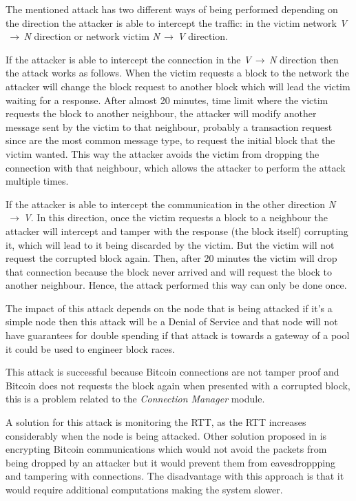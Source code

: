 The mentioned attack has two different ways of being performed depending on the direction the attacker is able to intercept the traffic: in the victim network \textit{V$\,\to\,$N} direction or network victim \textit{N$\,\to\,$V} direction.

If the attacker is able to intercept the connection in the \textit{V$\,\to\,$N} direction then the attack works as follows. When the victim requests a block to the network the attacker will change the block request to another block which will lead the victim waiting for a response. After almost 20 minutes, time limit where the victim requests the block to another neighbour, the attacker will modify another message sent by the victim to that neighbour, probably a transaction request since are the most common message type, to request the initial block that the victim wanted. This way the attacker avoids the victim from dropping the connection with that neighbour, which allows the attacker to perform the attack multiple times.

If the attacker is able to intercept the communication in the other direction \textit{N$\,\to\,$V}. In this direction, once the victim requests a block to a neighbour the attacker will intercept and tamper with the response (the block itself) corrupting it, which will lead to it being discarded by the victim. But the victim will not request the corrupted block again. Then, after 20 minutes the victim will drop that connection because the block never arrived and will request the block to another neighbour. Hence, the attack performed this way can only be done once.

The impact of this attack depends on the node that is being attacked if it's a simple node then this attack will be a Denial of Service and that node will not have guarantees for double spending if that attack is towards a gateway of a pool it could be used to engineer block races.

This attack is successful because Bitcoin connections are not tamper proof and Bitcoin does not requests the block again when presented with a corrupted block, this is a problem related to the \textit{Connection Manager} module.

A solution for this attack is monitoring the RTT, as the RTT increases considerably when the node is being attacked. Other solution proposed in \cite{apostolaki2016hijacking} is encrypting Bitcoin communications which would not avoid the packets from being dropped by an attacker but it would prevent them from eavesdroppping and tampering with connections. The disadvantage with this approach is that it would require additional computations making the system slower.

